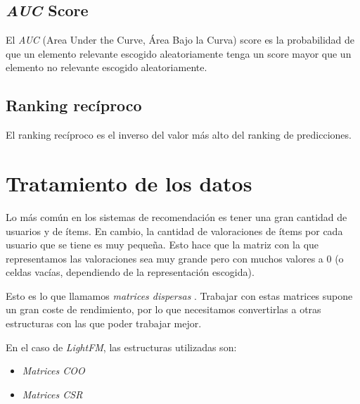 \subsection{\textit{AUC} Score}\label{auc-score}
El \textit{AUC} (Area Under the Curve, Área Bajo la Curva) score \cite{auc_score} es la probabilidad de que un elemento relevante escogido aleatoriamente tenga un score mayor que un elemento no relevante escogido aleatoriamente.

\subsection{Ranking recíproco}\label{ranking-reciproco}
El ranking recíproco \cite{reciprocal_rank} es el inverso del valor más alto del ranking de predicciones.

\section{Tratamiento de los datos}\label{tratamiento-datos}
Lo más común en los sistemas de recomendación es tener una gran cantidad de usuarios y de ítems. En cambio, la cantidad de valoraciones de ítems por cada usuario que se tiene es muy pequeña. Esto hace que la matriz con la que representamos las valoraciones sea muy grande pero con muchos valores a 0 (o celdas vacías, dependiendo de la representación escogida).  

Esto es lo que llamamos \textit{matrices dispersas} \cite{wiki:Sparse_matrix}. Trabajar con estas matrices supone un gran coste de rendimiento, por lo que necesitamos convertirlas a otras estructuras con las que poder trabajar mejor.

En el caso de \textit{LightFM}, las estructuras utilizadas son:
\begin{itemize}
\tightlist
\item \textit{Matrices COO}
\item \textit{Matrices CSR}  
\end{itemize}

